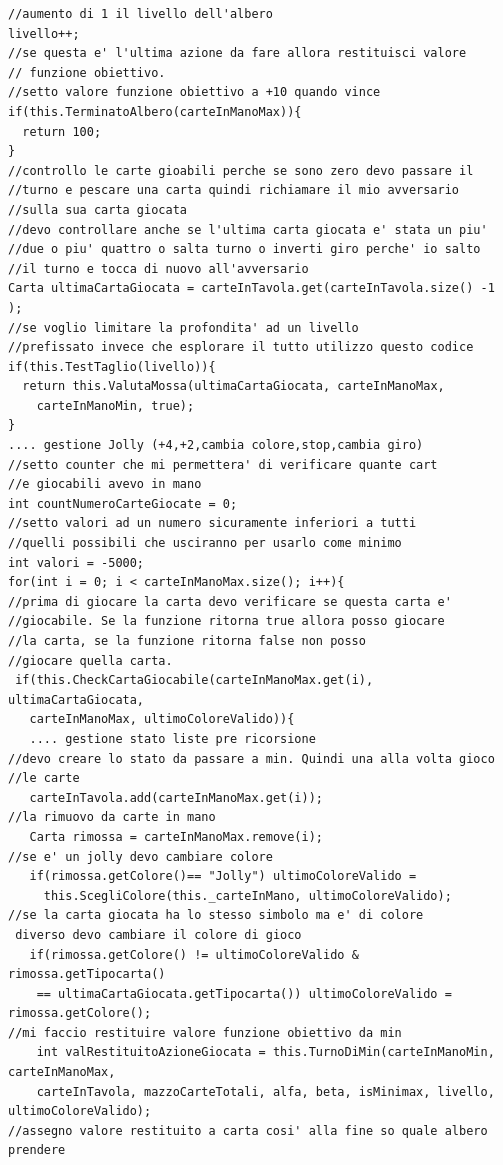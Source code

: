 \begin{lstlisting}
//aumento di 1 il livello dell'albero
livello++;
//se questa e' l'ultima azione da fare allora restituisci valore
// funzione obiettivo.
//setto valore funzione obiettivo a +10 quando vince
if(this.TerminatoAlbero(carteInManoMax)){
  return 100;
}
//controllo le carte gioabili perche se sono zero devo passare il
//turno e pescare una carta quindi richiamare il mio avversario
//sulla sua carta giocata
//devo controllare anche se l'ultima carta giocata e' stata un piu'
//due o piu' quattro o salta turno o inverti giro perche' io salto
//il turno e tocca di nuovo all'avversario
Carta ultimaCartaGiocata = carteInTavola.get(carteInTavola.size() -1 );
//se voglio limitare la profondita' ad un livello
//prefissato invece che esplorare il tutto utilizzo questo codice
if(this.TestTaglio(livello)){
  return this.ValutaMossa(ultimaCartaGiocata, carteInManoMax,
    carteInManoMin, true);
}	
.... gestione Jolly (+4,+2,cambia colore,stop,cambia giro)	
//setto counter che mi permettera' di verificare quante cart
//e giocabili avevo in mano
int countNumeroCarteGiocate = 0;
//setto valori ad un numero sicuramente inferiori a tutti 
//quelli possibili che usciranno per usarlo come minimo
int valori = -5000;
for(int i = 0; i < carteInManoMax.size(); i++){
//prima di giocare la carta devo verificare se questa carta e' 
//giocabile. Se la funzione ritorna true allora posso giocare 
//la carta, se la funzione ritorna false non posso
//giocare quella carta.
 if(this.CheckCartaGiocabile(carteInManoMax.get(i), ultimaCartaGiocata, 
   carteInManoMax, ultimoColoreValido)){
   .... gestione stato liste pre ricorsione
//devo creare lo stato da passare a min. Quindi una alla volta gioco
//le carte
   carteInTavola.add(carteInManoMax.get(i));
//la rimuovo da carte in mano
   Carta rimossa = carteInManoMax.remove(i);
//se e' un jolly devo cambiare colore
   if(rimossa.getColore()== "Jolly") ultimoColoreValido =
     this.ScegliColore(this._carteInMano, ultimoColoreValido);
//se la carta giocata ha lo stesso simbolo ma e' di colore
 diverso devo cambiare il colore di gioco
   if(rimossa.getColore() != ultimoColoreValido & rimossa.getTipocarta()
    == ultimaCartaGiocata.getTipocarta()) ultimoColoreValido = rimossa.getColore();
//mi faccio restituire valore funzione obiettivo da min
    int valRestituitoAzioneGiocata = this.TurnoDiMin(carteInManoMin, carteInManoMax, 
    carteInTavola, mazzoCarteTotali, alfa, beta, isMinimax, livello, ultimoColoreValido); 
//assegno valore restituito a carta cosi' alla fine so quale albero prendere

\end{lstlisting}
